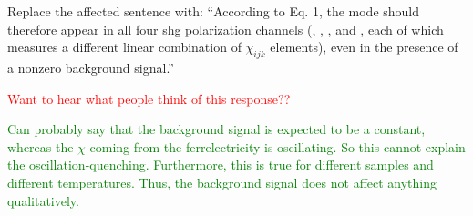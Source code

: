\begin{changesmade}
Replace the affected sentence with: ``According to Eq. 1, the \higgs mode should therefore appear in all four \gls{shg} polarization channels (\PP, \PS, \SP, and \SS, each of which measures a different linear combination of $\chi_{ijk}$ elements\citep{boyd}), even in the presence of a nonzero background signal.''
\end{changesmade}

\textcolor{red}{Want to hear what people think of this response??}

\textcolor{green}{Can probably say that the background signal is expected to be a constant, whereas the $\chi$ coming from the ferrelectricity is oscillating. So this cannot explain the oscillation-quenching. Furthermore, this is true for different samples and different temperatures. Thus, the background signal does not affect anything qualitatively. }
